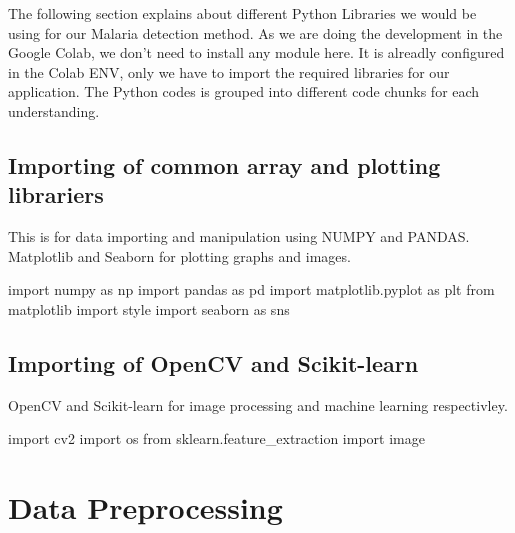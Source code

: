 \documentclass[]{book}
\newenvironment{Shaded}{\begin{snugshade}}{\end{snugshade}}
\newcommand{\ImportTok}[1]{#1}
\newcommand{\NormalTok}[1]{#1}
\begin{document}
The following section explains about different Python Libraries we would be using for our Malaria detection method. As we are doing the development in the Google Colab, we don't need to install any module here. It is alreadly configured in the Colab ENV, only we have to import the required libraries for our application. The Python codes is grouped into different code chunks for each understanding.

\hypertarget{importing-of-common-array-and-plotting-librariers}{%
\subsection{Importing of common array and plotting librariers}\label{importing-of-common-array-and-plotting-librariers}}

This is for data importing and manipulation using NUMPY and PANDAS. Matplotlib and Seaborn for plotting graphs and images.

\begin{Shaded}
\begin{Highlighting}[]
\ImportTok{import}\NormalTok{ numpy }\ImportTok{as}\NormalTok{ np}
\ImportTok{import}\NormalTok{ pandas }\ImportTok{as}\NormalTok{ pd}
\ImportTok{import}\NormalTok{ matplotlib.pyplot }\ImportTok{as}\NormalTok{ plt}
\ImportTok{from}\NormalTok{ matplotlib }\ImportTok{import}\NormalTok{ style}
\ImportTok{import}\NormalTok{ seaborn }\ImportTok{as}\NormalTok{ sns}
\end{Highlighting}
\end{Shaded}

\hypertarget{importing-of-opencv-and-scikit-learn}{%
\subsection{Importing of OpenCV and Scikit-learn}\label{importing-of-opencv-and-scikit-learn}}

OpenCV and Scikit-learn for image processing and machine learning respectivley.

\begin{Shaded}
\begin{Highlighting}[]
\ImportTok{import}\NormalTok{ cv2 }
\ImportTok{import}\NormalTok{ os}
\ImportTok{from}\NormalTok{ sklearn.feature_extraction }\ImportTok{import}\NormalTok{ image}
\end{Highlighting}
\end{Shaded}

\hypertarget{data-preprocessing}{%
\section{Data Preprocessing}\label{data-preprocessing}}
\end{document}
